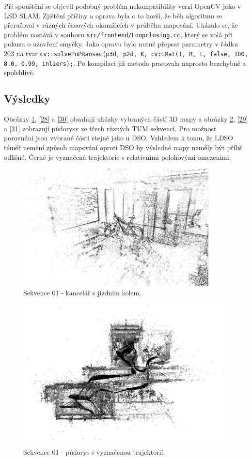 \documentclass[12pt,a4paper]{report}
\begin{document}
Při spouštění se objevil podobný problém nekompatibility verzí OpenCV jako v LSD SLAM. Zjištění příčiny a oprava byla o to horší, že běh algoritmu se přerušoval v různých časových okamžicích v průběhu mapování. Ukázalo se, že problém nastává v souboru \texttt{src/frontend/Loopclosing.cc}, který se volá při pokusu o uzavření smyčky. Jako opravu bylo nutné přepsat parametry v řádku 203 na tvar \texttt{cv::solvePnPRansac(p3d, p2d, K, cv::Mat(), R, t, false, 100, 8.0, 0.99, inliers);}. Po kompilaci již metoda pracovala naprosto bezchybně a spolehlivě.

\subsection*{Výsledky}
Obrázky \ref{26}, \ref{28} a \ref{30} obsahují ukázky vybraných částí 3D mapy a obrázky \ref{27}, \ref{29} a \ref{31} zobrazují půdorysy ze třech různých TUM sekvencí. Pro možnost porovnání jsou vybrané části stejné jako u DSO. Vzhledem k tomu, že LDSO téměř nemění způsob mapování oproti DSO by výsledné mapy neměly být příliš odlišné. Černě je vyznačená trajektorie s relativními polohovými omezeními.


\begin{figure}[H]
\centering
\includegraphics[width=0.9\textwidth]{img/LDSO_01_kolo.png}
\caption{Sekvence 01 - kancelář s jízdním kolem.}
\label{26}
\end{figure}

\begin{figure}[H]
\centering
\includegraphics[width=1\textwidth]{img/LDSO_01_top_b.png}
\caption{Sekvence 01 - půdorys s vyznačenou trajektorií.}
\label{27}
\end{figure}
\end{document}
